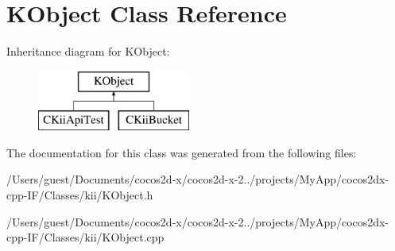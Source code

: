 \hypertarget{class_k_object}{\section{K\-Object Class Reference}
\label{class_k_object}
}
Inheritance diagram for K\-Object\-:\begin{figure}[H]
\begin{center}
\leavevmode
\includegraphics[height=2.000000cm]{class_k_object}
\end{center}
\end{figure}


The documentation for this class was generated from the following files\-:\begin{DoxyCompactItemize}
\item 
/\-Users/guest/\-Documents/cocos2d-\/x/cocos2d-\/x-\/2../projects/\-My\-App/cocos2dx-\/cpp-\/\-I\-F/\-Classes/kii/K\-Object.\-h\item 
/\-Users/guest/\-Documents/cocos2d-\/x/cocos2d-\/x-\/2../projects/\-My\-App/cocos2dx-\/cpp-\/\-I\-F/\-Classes/kii/K\-Object.\-cpp\end{DoxyCompactItemize}
